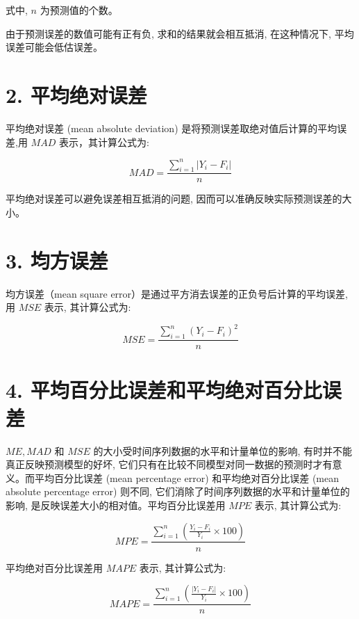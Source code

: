 \documentclass[10pt]{article}
\begin{document}
\begin{CJK*}{UTF8}{bsmi}
式中, $n$ 为预测值的个数。

由于预测误差的数值可能有正有负, 求和的结果就会相互抵消, 在这种情况下, 平均误差可能会低估误差。

\section*{2. 平均绝对误差}
平均绝对误差 (mean absolute deviation) 是将预测误差取绝对值后计算的平均误差,用 $M A D$ 表示，其计算公式为:


\begin{equation*}
M A D=\frac{\sum_{i=1}^{n}\left|Y_{i}-F_{i}\right|}{n} \tag{13.7}
\end{equation*}


平均绝对误差可以避免误差相互抵消的问题, 因而可以准确反映实际预测误差的大小。

\section*{3. 均方误差}
均方误差（mean square error）是通过平方消去误差的正负号后计算的平均误差, 用 $M S E$ 表示, 其计算公式为:


\begin{equation*}
M S E=\frac{\sum_{i=1}^{n}\left(Y_{i}-F_{i}\right)^{2}}{n} \tag{13.8}
\end{equation*}


\section*{4. 平均百分比误差和平均绝对百分比误差}
$M E, M A D$ 和 $M S E$ 的大小受时间序列数据的水平和计量单位的影响, 有时并不能真正反映预测模型的好坏, 它们只有在比较不同模型对同一数据的预测时才有意义。而平均百分比误差 (mean percentage error) 和平均绝对百分比误差 (mean absolute percentage error) 则不同, 它们消除了时间序列数据的水平和计量单位的影响, 是反映误差大小的相对值。平均百分比误差用 $M P E$ 表示, 其计算公式为:


\begin{equation*}
M P E=\frac{\sum_{i=1}^{n}\left(\frac{Y_{i}-F_{i}}{Y_{i}} \times 100\right)}{n} \tag{13.9}
\end{equation*}


平均绝对百分比误差用 $M A P E$ 表示, 其计算公式为:


\begin{equation*}
M A P E=\frac{\sum_{i=1}^{n}\left(\frac{\left|Y_{i}-F_{i}\right|}{Y_{i}} \times 100\right)}{n} \tag{13.10}
\end{equation*}



\end{CJK*}
\end{document}
